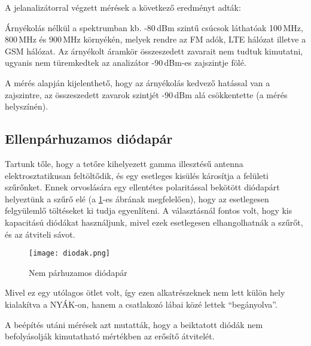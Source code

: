 A jelanalizátorral végzett mérések a következő eredményt adták:

Árnyékolás nélkül a spektrumban kb. -80\,dBm szintű csúcsok láthatóak 100\,MHz, 800\,MHz és 900\,MHz környékén, melyek rendre az FM adók, LTE hálózat illetve a GSM hálózat. Az árnyékolt áramkör összeszedett zavarait nem tudtuk kimutatni, ugyanis nem türemkedtek az analizátor -90\,dBm-es zajszintje fölé.

A mérés alapján kijelenthető, hogy az árnyékolás kedvező hatással van a zajszintre, az összeszedett zavarok szintjét -90\,dBm alá csökkentette (a mérés helyszínén).


\subsection{Ellenpárhuzamos diódapár}
\label{subsec:diodak}

Tartunk tőle, hogy a tetőre kihelyezett gamma illesztésű antenna elektrosztatikusan feltöltődik, és egy esetleges kisülés károsítja a felületi szűrőnket. Ennek orvoslására egy ellentétes polaritással bekötött diódapárt helyeztünk a szűrő elé (a \ref{fig:diodak}-es ábrának megfelelően), hogy az esetlegesen felgyülemlő töltéseket ki tudja egyenlíteni. A választásnál fontos volt, hogy kis kapacitású diódákat\cite{dioda} használjunk, mivel ezek esetlegesen elhangolhatnák a szűrőt, és az átviteli sávot.

\begin{figure}[!ht]
	\centering
	\texttt{[image: diodak.png]}
	\caption{Nem párhuzamos diódapár}
	\label{fig:diodak}
\end{figure}

Mivel ez egy utólagos ötlet volt, így ezen alkatrészeknek nem lett külön hely kialakítva a NYÁK-on, hanem a csatlakozó lábai közé lettek \enquote{begányolva}.

A beépítés utáni mérések azt mutatták, hogy a beiktatott diódák nem befolyásolják kimutatható mértékben az erősítő átvitelét.